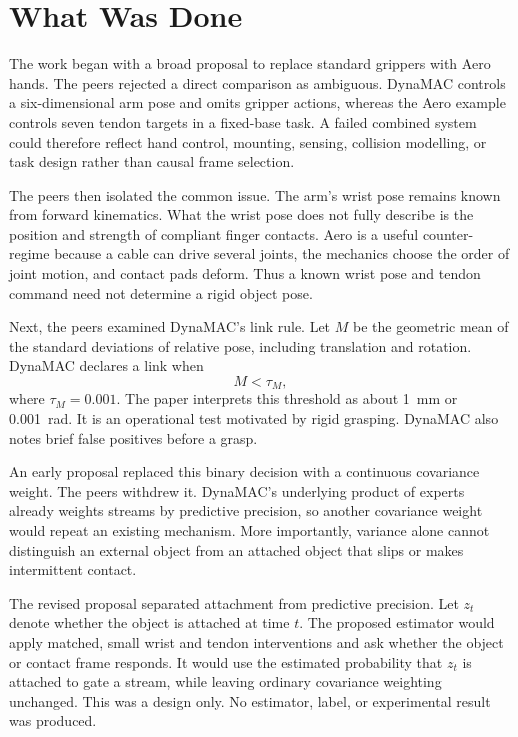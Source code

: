 \documentclass{article}
\begin{document}
\section{What Was Done}

The work began with a broad proposal to replace standard grippers with Aero hands. The peers rejected a direct comparison as ambiguous. DynaMAC controls a six-dimensional arm pose and omits gripper actions, whereas the Aero example controls seven tendon targets in a fixed-base task. A failed combined system could therefore reflect hand control, mounting, sensing, collision modelling, or task design rather than causal frame selection.

The peers then isolated the common issue. The arm's wrist pose remains known from forward kinematics. What the wrist pose does not fully describe is the position and strength of compliant finger contacts. Aero is a useful counter-regime because a cable can drive several joints, the mechanics choose the order of joint motion, and contact pads deform. Thus a known wrist pose and tendon command need not determine a rigid object pose.

Next, the peers examined DynaMAC's link rule. Let $M$ be the geometric mean of the standard deviations of relative pose, including translation and rotation. DynaMAC declares a link when
\begin{equation}
  M < \tau_M,
\end{equation}
where $\tau_M=0.001$. The paper interprets this threshold as about 1~mm or 0.001~rad. It is an operational test motivated by rigid grasping. DynaMAC also notes brief false positives before a grasp.

An early proposal replaced this binary decision with a continuous covariance weight. The peers withdrew it. DynaMAC's underlying product of experts already weights streams by predictive precision, so another covariance weight would repeat an existing mechanism. More importantly, variance alone cannot distinguish an external object from an attached object that slips or makes intermittent contact.

The revised proposal separated attachment from predictive precision. Let $z_t$ denote whether the object is attached at time $t$. The proposed estimator would apply matched, small wrist and tendon interventions and ask whether the object or contact frame responds. It would use the estimated probability that $z_t$ is attached to gate a stream, while leaving ordinary covariance weighting unchanged. This was a design only. No estimator, label, or experimental result was produced.
\end{document}
